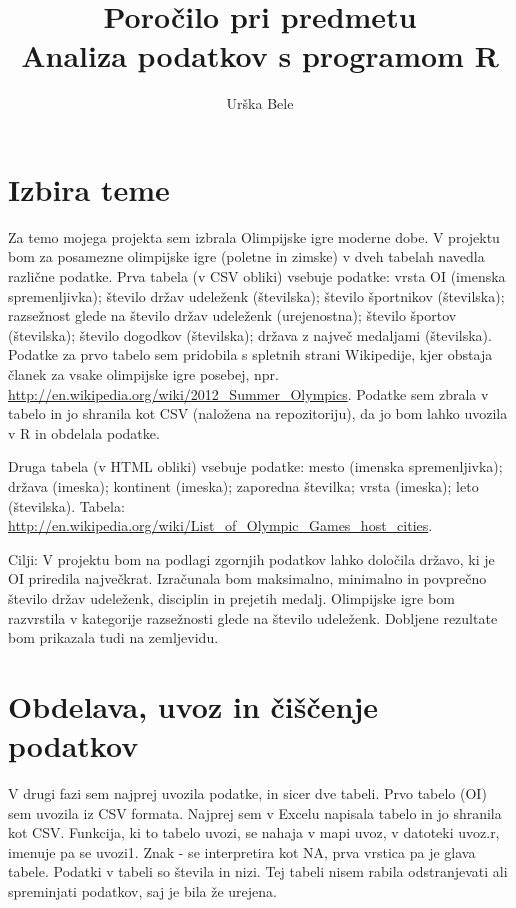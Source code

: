 \documentclass[11pt,a4paper]{article}
\begin{document}
\title{Poročilo pri predmetu \\
Analiza podatkov s programom R}
\author{Urška Bele}
\maketitle

\section{Izbira teme}

Za temo mojega projekta sem izbrala Olimpijske igre moderne dobe.
V projektu bom za posamezne olimpijske igre (poletne in zimske) v dveh tabelah navedla različne podatke.
Prva tabela (v CSV obliki) vsebuje podatke: vrsta OI (imenska spremenljivka); število držav udeleženk (številska); 
število športnikov (številska); razsežnost glede na število držav udeleženk (urejenostna); število športov (številska); 
število dogodkov (številska); država z največ medaljami (številska).
Podatke za prvo tabelo sem pridobila s spletnih strani
 Wikipedije, kjer obstaja članek za vsake olimpijske igre posebej, npr.
\url{http://en.wikipedia.org/wiki/2012_Summer_Olympics}. 
 Podatke sem zbrala v tabelo in jo shranila kot CSV (naložena na repozitoriju), da jo bom lahko uvozila v R 
 in obdelala podatke.

Druga tabela (v HTML obliki) vsebuje podatke: mesto (imenska spremenljivka); država (imeska); kontinent (imeska); 
zaporedna številka; vrsta (imeska); leto (številska). Tabela:
\url{http://en.wikipedia.org/wiki/List_of_Olympic_Games_host_cities}.

Cilji: V projektu bom na podlagi zgornjih podatkov lahko določila državo, ki je OI priredila največkrat. 
Izračunala bom maksimalno, minimalno in povprečno število držav udeleženk, disciplin in prejetih medalj. 
Olimpijske igre bom razvrstila v kategorije razsežnosti glede na število udeleženk. Dobljene rezultate bom prikazala tudi 
na zemljevidu.

\newpage
\section{Obdelava, uvoz in čiščenje podatkov}
V drugi fazi sem najprej uvozila podatke, in sicer dve tabeli. Prvo tabelo (OI) sem uvozila iz CSV formata. Najprej sem v Excelu napisala tabelo in jo shranila kot CSV. Funkcija, ki to tabelo uvozi, se nahaja v mapi uvoz, v datoteki uvoz.r, imenuje pa se uvozi1. Znak - se interpretira kot NA, prva vrstica pa je glava tabele. Podatki v tabeli so števila in nizi. Tej tabeli nisem rabila odstranjevati  ali spreminjati podatkov, saj je bila že urejena.
\end{document}
